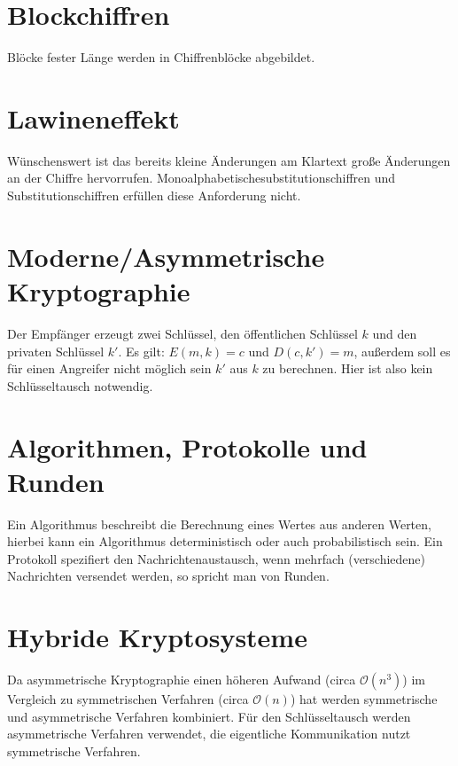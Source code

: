 \section{Blockchiffren}
Blöcke fester Länge werden in Chiffrenblöcke abgebildet.

\section{Lawineneffekt}
Wünschenswert ist das bereits kleine Änderungen am Klartext große Änderungen an der Chiffre hervorrufen.
Monoalphabetischesubstitutionschiffren und Substitutionschiffren erfüllen diese Anforderung nicht.

\section{Moderne/Asymmetrische Kryptographie}
Der Empfänger erzeugt zwei Schlüssel, den öffentlichen Schlüssel $k$ und den privaten Schlüssel $k'$. 
Es gilt: $E(m, k) = c$ und $D(c, k') = m$, außerdem soll es für einen
Angreifer nicht möglich sein $k'$ aus $k$ zu berechnen.
Hier ist also kein Schlüsseltausch notwendig.

\section{Algorithmen, Protokolle und Runden}
Ein Algorithmus beschreibt die Berechnung eines Wertes aus anderen Werten, hierbei kann ein Algorithmus deterministisch oder auch probabilistisch sein.
Ein Protokoll spezifiert den Nachrichtenaustausch, wenn mehrfach (verschiedene) Nachrichten versendet werden, so spricht man von Runden.

\section{Hybride Kryptosysteme}
Da asymmetrische Kryptographie einen höheren Aufwand (circa $\mathcal{O}(n^3)$) im 
Vergleich zu symmetrischen Verfahren (circa $\mathcal{O}(n)$) hat werden symmetrische
und asymmetrische Verfahren kombiniert. Für den Schlüsseltausch werden asymmetrische
Verfahren verwendet, die eigentliche Kommunikation nutzt symmetrische Verfahren.

